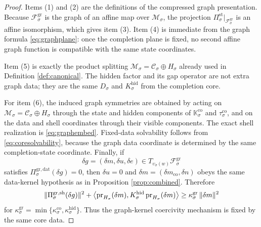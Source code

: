 \documentclass[11pt]{article}
\newcommand{\ProtoSpace}[1]{\mathcal M_{#1}}
\newcommand{\GapSpace}[1]{H_{#1}}
\newcommand{\GapBody}[1]{D_{#1}}
\newcommand{\HiddenOperator}[1]{K_{#1}^{\mathrm{hid}}}
\newcommand{\CoreState}[1]{\mathcal C_{#1}}
\newcommand{\CoreSym}[1]{\mathbb K_{#1}^{\mathrm{co}}}
\newcommand{\CoreTime}[1]{\tau_{#1}^{\mathrm{co}}}
\newcommand{\GraphAffine}[1]{\mathcal F_{#1}^{\mathrm{gr}}}
\newcommand{\StateProj}[1]{\Pi_{#1}^{\mathrm{st}}}
\newcommand{\GraphDataProj}[1]{\Pi_{#1}^{\mathrm{gr,dat}}}
\newcommand{\GraphShellProj}[1]{\Pi_{#1}^{\mathrm{gr,sh}}}
\newcommand{\GraphEmbed}[1]{\upsilon_{#1}}
\begin{document}
\begin{proof}
Items (1) and (2) are the definitions of the compressed graph presentation. Because \(\GraphAffine{\sigma}\) is the graph of an affine map over \(\ProtoSpace{\sigma}\), the projection \(\StateProj{\sigma}\big|_{\GraphAffine{\sigma}}\) is an affine isomorphism, which gives item (3). Item (4) is immediate from the graph formula \eqref{eq:graphplane}: once the completion plane is fixed, no second affine graph function is compatible with the same state coordinates.

Item (5) is exactly the product splitting \(\ProtoSpace{\sigma}=\CoreState{\sigma}\oplus\GapSpace{\sigma}\) already used in Definition \ref{def:canonical}. The hidden factor and its gap operator are not extra graph data; they are the same \(\GapBody{\sigma}\) and \(\HiddenOperator{\sigma}\) from the completion core.

For item (6), the induced graph symmetries are obtained by acting on \(\ProtoSpace{\sigma}=\CoreState{\sigma}\oplus\GapSpace{\sigma}\) through the state and hidden components of \(\CoreSym{\sigma}\) and \(\CoreTime{\sigma}\), and on the data and shell coordinates through their visible components. The exact shell realization is \eqref{eq:graphembed}. Fixed-data solvability follows from \eqref{eq:coresolvability}, because the graph data coordinate is determined by the same completion-state coordinate. Finally, if
\[
\delta g=(\delta m,\delta u,\delta e)\in
T_{\GraphEmbed{\sigma}(w)}\GraphAffine{\sigma}
\]
satisfies \(\GraphDataProj{\sigma}(\delta g)=0\), then \(\delta u=0\) and \(\delta m=(\delta m_{\mathrm{co}},\delta n)\) obeys the same data-kernel hypothesis as in Proposition \ref{prop:combined}. Therefore
\[
\|\GraphShellProj{\sigma}(\delta g)\|^{2}
+
\ev{\operatorname{pr}_{\GapSpace{\sigma}}(\delta m),
\HiddenOperator{\sigma}\operatorname{pr}_{\GapSpace{\sigma}}(\delta m)}
\ge
\kappa_{\sigma}^{\mathrm{gr}}\,
\|\delta m\|^{2}
\]
for \(\kappa_{\sigma}^{\mathrm{gr}}=\min\{\kappa_{\sigma}^{\mathrm{co}},\kappa_{\sigma}^{\mathrm{hid}}\}\). Thus the graph-kernel coercivity mechanism is fixed by the same core data.
\end{proof}
\end{document}
